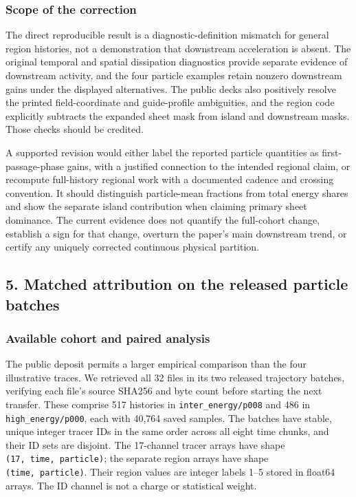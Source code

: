 \subsubsection{Scope of the correction}\label{scope-of-the-correction}

The direct reproducible result is a diagnostic-definition mismatch for
general region histories, not a demonstration that downstream
acceleration is absent. The original temporal and spatial dissipation
diagnostics provide separate evidence of downstream activity, and the
four particle examples retain nonzero downstream gains under the
displayed alternatives. The public decks also positively resolve the
printed field-coordinate and guide-profile ambiguities, and the region
code explicitly subtracts the expanded sheet mask from island and
downstream masks. Those checks should be credited.

A supported revision would either label the reported particle quantities
as first-passage-phase gains, with a justified connection to the
intended regional claim, or recompute full-history regional work with a
documented cadence and crossing convention. It should distinguish
particle-mean fractions from total energy shares and show the separate
island contribution when claiming primary sheet dominance. The current
evidence does not quantify the full-cohort change, establish a sign for
that change, overturn the paper's main downstream trend, or certify any
uniquely corrected continuous physical partition.

\FloatBarrier
\subsection{5. Matched attribution on the released particle
batches}\label{matched-attribution-on-the-released-particle-batches}

\subsubsection{Available cohort and paired
analysis}\label{available-cohort-and-paired-analysis}

The public deposit permits a larger empirical comparison than the four
illustrative traces. We retrieved all 32 files in its two released
trajectory batches, verifying each file's source SHA256 and byte count
before starting the next transfer. These comprise 517 histories in
\nolinkurl{inter_energy/p008} and 486 in \nolinkurl{high_energy/p000}, each
with 40,764 saved samples. The batches have stable, unique integer
tracer IDs in the same order across all eight time chunks, and their ID
sets are disjoint. The 17-channel tracer arrays have shape
\texttt{(17,\ time,\ particle)}; the separate region arrays have shape
\texttt{(time,\ particle)}. Their region values are integer labels 1--5
stored in float64 arrays. The ID channel is not a charge or statistical
weight.

